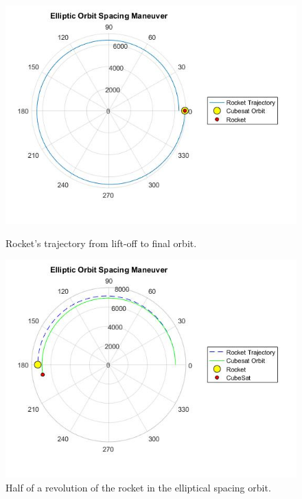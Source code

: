\begin{figure}[H]
\includegraphics[scale=0.7]{./Sections_CD/S4-First_Placement/Images_S4/Picture_3_S4.jpg}
\caption{Rocket's trajectory from lift-off to final orbit.}
\label{orbit1}
\includegraphics[scale=0.7]{./Sections_CD/S4-First_Placement/Images_S4/Picture_4_S4.jpg}
\caption{Half of a revolution of the rocket in the elliptical spacing orbit.}
\label{orbit2}
\end{figure}
